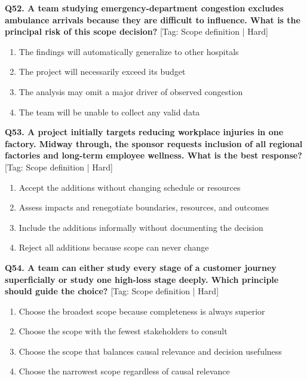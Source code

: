 \noindent\textbf{Q52. A team studying emergency-department congestion excludes ambulance arrivals because they are difficult to influence. What is the principal risk of this scope decision?} \hfill [Tag: Scope definition | Hard]
\begin{enumerate}[label=(\alph*),topsep=2pt,itemsep=1pt,partopsep=0pt,parsep=0pt]
    \item {The findings will automatically generalize to other hospitals}
    \item {The project will necessarily exceed its budget}
    \item {The analysis may omit a major driver of observed congestion}
    \item {The team will be unable to collect any valid data}
\end{enumerate}
\vspace{2mm}

\noindent\textbf{Q53. A project initially targets reducing workplace injuries in one factory. Midway through, the sponsor requests inclusion of all regional factories and long-term employee wellness. What is the best response?} \hfill [Tag: Scope definition | Hard]
\begin{enumerate}[label=(\alph*),topsep=2pt,itemsep=1pt,partopsep=0pt,parsep=0pt]
    \item {Accept the additions without changing schedule or resources}
    \item {Assess impacts and renegotiate boundaries, resources, and outcomes}
    \item {Include the additions informally without documenting the decision}
    \item {Reject all additions because scope can never change}
\end{enumerate}
\vspace{2mm}

\noindent\textbf{Q54. A team can either study every stage of a customer journey superficially or study one high-loss stage deeply. Which principle should guide the choice?} \hfill [Tag: Scope definition | Hard]
\begin{enumerate}[label=(\alph*),topsep=2pt,itemsep=1pt,partopsep=0pt,parsep=0pt]
    \item {Choose the broadest scope because completeness is always superior}
    \item {Choose the scope with the fewest stakeholders to consult}
    \item {Choose the scope that balances causal relevance and decision usefulness}
    \item {Choose the narrowest scope regardless of causal relevance}
\end{enumerate}
\vspace{2mm}

